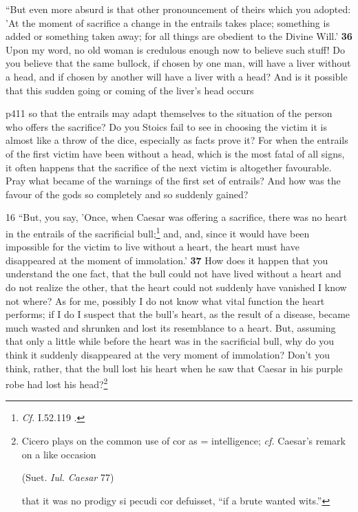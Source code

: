 ``But even more absurd is that other pronouncement of theirs which you adopted: 'At the moment of sacrifice a change in the entrails takes place; something is added or something taken away; for all things are obedient to the Divine Will.' \textbf{36} Upon my word, no old woman is credulous enough now to believe such stuff! Do you believe that the same bullock, if chosen by one man, will have a liver without a head, and if chosen by another will have a liver with a head? And is it possible that this sudden going or coming of the liver's head occurs

p411 so that the entrails may adapt themselves to the situation of the person who offers the sacrifice? Do you Stoics fail to see in choosing the victim it is almost like a throw of the dice, especially as facts prove it? For when the entrails of the first victim have been without a head, which is the most fatal of all signs, it often happens that the sacrifice of the next victim is altogether favourable. Pray what became of the warnings of the first set of entrails? And how was the favour of the gods so completely and so suddenly gained?

16
``But, you say, 'Once, when Caesar was offering a sacrifice, there was no heart in the entrails of the sacrificial bull;\texthebrew{}\footnote{\emph{Cf.}
I.52.119 .

} and, and, since it would have been impossible for the victim to live without a heart, the heart must have disappeared at the moment of immolation.' \textbf{37} How does it happen that you understand the one fact, that the bull could not have lived without a heart and do not realize the other, that the heart could not suddenly have vanished I know not where? As for me, possibly I do not know what vital function the heart performs; if I do I suspect that the bull's heart, as the result of a disease, became much wasted and shrunken and lost its resemblance to a heart. But, assuming that only a little while before the heart was in the sacrificial bull, why do you think it suddenly disappeared at the very moment of immolation? Don't you think, rather, that the bull lost his heart when he saw that Caesar in his purple robe had lost his head?\footnote{Cicero plays on the common use of cor as = intelligence; \emph{cf.} Caesar's remark on a like occasion

(Suet. \emph{Iul. Caesar} 77)

that it was no prodigy si pecudi cor defuisset, ``if a brute wanted wits.''

}

